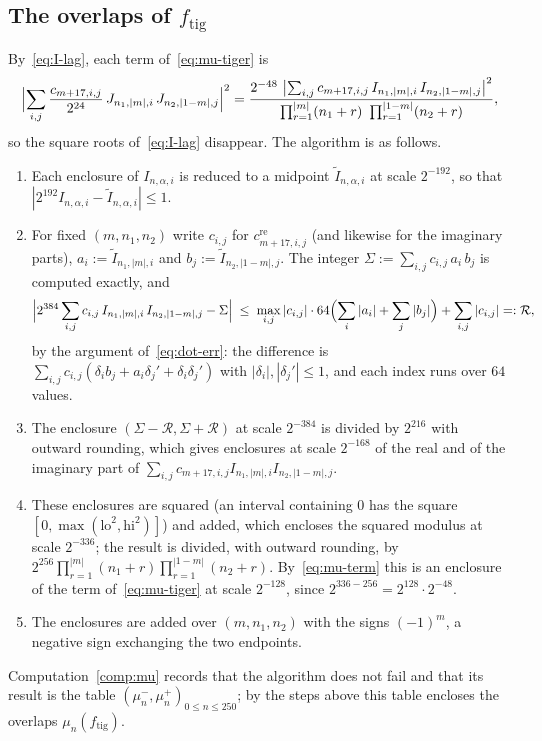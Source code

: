 \documentclass[11pt,reqno]{amsart}
\theoremstyle{definition}
\numberwithin{equation}{section}
\newcommand{\ftig}{f_{\mathrm{tig}}}
\begin{document}
\subsection{The overlaps of \texorpdfstring{$\ftig$}{f-tig}}\label{app:overlaps}
By~\eqref{eq:I-lag}, each term of~\eqref{eq:mu-tiger} is
\begin{equation}\label{eq:mu-term}
  \Bigl|\sum_{i,j} \frac{c_{m+17,i,j}}{2^{24}}\, J_{n_1,|m|,i}\, J_{n_2,|1-m|,j}\Bigr|^2
  =\frac{2^{-48}\ \bigl|\sum_{i,j} c_{m+17,i,j}\, I_{n_1,|m|,i}\, I_{n_2,|1-m|,j}\bigr|^2}{\prod_{r=1}^{|m|}(n_1+r)\ \prod_{r=1}^{|1-m|}(n_2+r)} ,
\end{equation}
so the square roots of~\eqref{eq:I-lag} disappear. The algorithm is as follows.
\begin{enumerate}
  \item Each enclosure of $I_{n,\alpha,i}$ is reduced to a midpoint $\tilde I_{n,\alpha,i}$ at scale $2^{-192}$, so that $|2^{192}I_{n,\alpha,i}-\tilde I_{n,\alpha,i}|\le1$.
  \item For fixed $(m,n_1,n_2)$ write $c_{i,j}$ for $c^{\mathrm{re}}_{m+17,i,j}$ (and likewise for the imaginary parts), $a_i:=\tilde I_{n_1,|m|,i}$ and $b_j:=\tilde I_{n_2,|1-m|,j}$. The integer $\Sigma:=\sum_{i,j}c_{i,j}\,a_i\,b_j$ is computed exactly, and
  \[
    \Bigl|2^{384}\sum_{i,j}c_{i,j}\,I_{n_1,|m|,i}\,I_{n_2,|1-m|,j}-\Sigma\Bigr|\;\le\;\max_{i,j}|c_{i,j}|\cdot64\Bigl(\sum_i|a_i|+\sum_j|b_j|\Bigr)+\sum_{i,j}|c_{i,j}|=:\mathcal{R},
  \]
  by the argument of~\eqref{eq:dot-err}: the difference is $\sum_{i,j}c_{i,j}(\delta_ib_j+a_i\delta_j'+\delta_i\delta_j')$ with $|\delta_i|,|\delta_j'|\le1$, and each index runs over $64$ values.
  \item The enclosure $(\Sigma-\mathcal{R},\Sigma+\mathcal{R})$ at scale $2^{-384}$ is divided by $2^{216}$ with outward rounding, which gives enclosures at scale $2^{-168}$ of the real and of the imaginary part of $\sum_{i,j}c_{m+17,i,j}I_{n_1,|m|,i}I_{n_2,|1-m|,j}$.
  \item These enclosures are squared (an interval containing $0$ has the square $[0,\max(\mathrm{lo}^2,\mathrm{hi}^2)]$) and added, which encloses the squared modulus at scale $2^{-336}$; the result is divided, with outward rounding, by $2^{256}\prod_{r=1}^{|m|}(n_1+r)\prod_{r=1}^{|1-m|}(n_2+r)$. By~\eqref{eq:mu-term} this is an enclosure of the term of~\eqref{eq:mu-tiger} at scale $2^{-128}$, since $2^{336-256}=2^{128}\cdot2^{-48}$.
  \item The enclosures are added over $(m,n_1,n_2)$ with the signs $(-1)^m$, a negative sign exchanging the two endpoints.
\end{enumerate}
Computation~\ref{comp:mu} records that the algorithm does not fail and that its result is the table $(\mu_n^-,\mu_n^+)_{0\le n\le250}$; by the steps above this table encloses the overlaps $\mu_n(\ftig)$.
\end{document}
